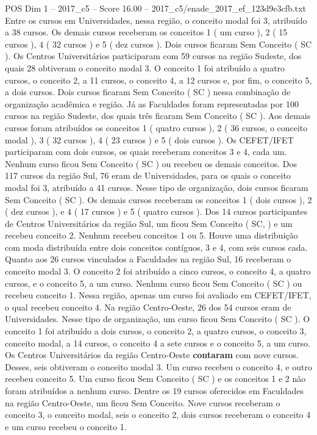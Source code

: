 \begin{textsample}{POS Dim 1 – 2017\_c5 – Score 16.00 – 2017\_c5/enade\_2017\_ef\_123d9e3cfb.txt}
Entre os cursos em Universidades, nessa região, o conceito modal foi 3, atribuído a 38 cursos.
Os demais cursos receberam os conceitos 1 ( um curso ), 2 ( 15 cursos ), 4 ( 32 cursos ) e 5 ( dez cursos ).
Dois cursos ficaram Sem Conceito ( SC ).
Os Centros Universitários participaram com 59 cursos na região Sudeste, dos quais 28 obtiveram o conceito modal 3.
O conceito 1 foi atribuído a quatro cursos, o conceito 2, a 11 cursos, o conceito 4, a 12 cursos e, por fim, o conceito 5, a dois cursos.
Dois cursos ficaram Sem Conceito ( SC ) nessa combinação de organização acadêmica e região.
Já as Faculdades foram representadas por 100 cursos na região Sudeste, dos quais três ficaram Sem Conceito ( SC ).
Aos demais cursos foram atribuídos os conceitos 1 ( quatro cursos ), 2 ( 36 cursos, o conceito modal ), 3 ( 32 cursos ), 4 ( 23 cursos ) e 5 ( dois cursos ).
Os CEFET/IFET participaram com dois cursos, os quais receberam conceitos 3 e 4, cada um.
Nenhum curso ficou Sem Conceito ( SC ) ou recebeu os demais conceitos.
Dos 117 cursos da região Sul, 76 eram de Universidades, para os quais o conceito modal foi 3, atribuído a 41 cursos.
Nesse tipo de organização, dois cursos ficaram Sem Conceito ( SC ).
Os demais cursos receberam os conceitos 1 ( dois cursos ), 2 ( dez cursos ), e 4 ( 17 cursos ) e 5 ( quatro cursos ).
Dos 14 cursos participantes de Centros Universitários da região Sul, um ficou Sem Conceito ( SC, ) e um recebeu conceito 2.
Nenhum recebeu conceitos 1 ou 5.
Houve uma distribuição com moda distribuída entre dois conceitos contíguos, 3 e 4, com seis cursos cada.
Quanto aos 26 cursos vinculados a Faculdades na região Sul, 16 receberam o conceito modal 3.
O conceito 2 foi atribuído a cinco cursos, o conceito 4, a quatro cursos, e o conceito 5, a um curso.
Nenhum curso ficou Sem Conceito ( SC ) ou recebeu conceito 1.
Nessa região, apenas um curso foi avaliado em CEFET/IFET, o qual recebeu conceito 4.
Na região Centro-Oeste, 26 dos 54 cursos eram de Universidades.
Nesse tipo de organização, um curso ficou Sem Conceito ( SC ).
O conceito 1 foi atribuído a dois cursos, o conceito 2, a quatro cursos, o conceito 3, conceito modal, a 14 cursos, o conceito 4 a sete cursos e o conceito 5, a um curso.
Os Centros Universitários da região Centro-Oeste \textbf{contaram} com nove cursos.
Desses, seis obtiveram o conceito modal 3.
Um curso recebeu o conceito 4, e outro recebeu conceito 5.
Um curso ficou Sem Conceito ( SC ) e os conceitos 1 e 2 não foram atribuídos a nenhum curso.
Dentre os 19 cursos oferecidos em Faculdades na região Centro-Oeste, um ficou Sem Conceito.
Nove cursos receberam o conceito 3, o conceito modal, seis o conceito 2, dois cursos receberam o conceito 4 e um curso recebeu o conceito 1.

\end{textsample}
